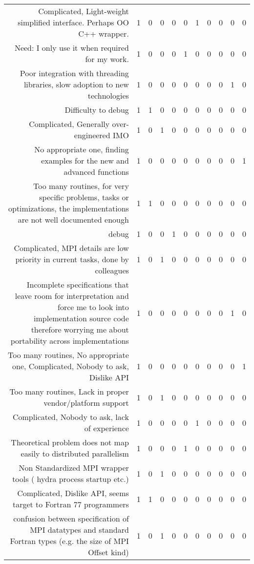 {\begin{landscape}
\begin{longtable}[htb]{r|c|c|c|c|c|c|c|c|c|c}
{Complicated, Light-weight simplified interface. Perhaps OO C++ wrapper.} & 1 & 0 & 0 & 0 & 0 & 1 & 0 & 0 & 0 & 0 \\%
{Need: I only use it when required for my work.} & 1 & 0 & 0 & 0 & 1 & 0 & 0 & 0 & 0 & 0 \\%
{Poor integration with threading libraries, slow adoption to new technologies} & 1 & 0 & 0 & 0 & 0 & 0 & 0 & 0 & 1 & 0 \\%
{Difficulty to debug} & 1 & 1 & 0 & 0 & 0 & 0 & 0 & 0 & 0 & 0 \\%
{Complicated, Generally over-engineered IMO} & 1 & 0 & 1 & 0 & 0 & 0 & 0 & 0 & 0 & 0 \\%
{No appropriate one, finding examples for the new and advanced functions} & 1 & 0 & 0 & 0 & 0 & 0 & 0 & 0 & 0 & 1 \\%
{Too many routines, for very specific problems, tasks or optimizations, the implementations are not well documented enough} & 1 & 1 & 0 & 0 & 0 & 0 & 0 & 0 & 0 & 0 \\%
{debug} & 1 & 0 & 0 & 1 & 0 & 0 & 0 & 0 & 0 & 0 \\%
{Complicated, MPI details are low priority in current tasks, done by colleagues} & 1 & 0 & 1 & 0 & 0 & 0 & 0 & 0 & 0 & 0 \\%
{Incomplete specifications that leave room for interpretation and force me to look into implementation source code therefore worrying me about portability across implementations} & 1 & 0 & 0 & 0 & 0 & 0 & 0 & 0 & 1 & 0 \\%
{Too many routines, No appropriate one, Complicated, Nobody to ask, Dislike API} & 1 & 0 & 0 & 0 & 0 & 0 & 0 & 0 & 0 & 1 \\%
{Too many routines, Lack in proper vendor/platform support} & 1 & 0 & 1 & 0 & 0 & 0 & 0 & 0 & 0 & 0 \\%
{Complicated, Nobody to ask, lack of experience} & 1 & 0 & 0 & 0 & 0 & 1 & 0 & 0 & 0 & 0 \\%
{Theoretical problem does not map easily to distributed parallelism} & 1 & 0 & 0 & 0 & 1 & 0 & 0 & 0 & 0 & 0 \\%
{Non  Standardized MPI wrapper tools ( hydra process startup etc.)} & 1 & 0 & 1 & 0 & 0 & 0 & 0 & 0 & 0 & 0 \\%
{Complicated, Dislike API, seems target to Fortran 77 programmers} & 1 & 1 & 0 & 0 & 0 & 0 & 0 & 0 & 0 & 0 \\%
{confusion between specification of MPI datatypes and standard Fortran types (e.g. the size of MPI Offset kind)} & 1 & 0 & 1 & 0 & 0 & 0 & 0 & 0 & 0 & 0 \\%

\end{longtable}
\end{landscape}}
